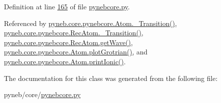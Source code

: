 Definition at line \hyperlink{pynebcore_8py_source_l00165}{165} of file \hyperlink{pynebcore_8py_source}{pynebcore.\+py}.



Referenced by \hyperlink{pynebcore_8py_source_l01367}{pyneb.\+core.\+pynebcore.\+Atom.\+\_\+\+Transition()}, \hyperlink{pynebcore_8py_source_l02696}{pyneb.\+core.\+pynebcore.\+Rec\+Atom.\+\_\+\+Transition()}, \hyperlink{pynebcore_8py_source_l02623}{pyneb.\+core.\+pynebcore.\+Rec\+Atom.\+get\+Wave()}, \hyperlink{pynebcore_8py_source_l02372}{pyneb.\+core.\+pynebcore.\+Atom.\+plot\+Grotrian()}, and \hyperlink{pynebcore_8py_source_l02167}{pyneb.\+core.\+pynebcore.\+Atom.\+print\+Ionic()}.



The documentation for this class was generated from the following file\+:\begin{DoxyCompactItemize}
\item 
pyneb/core/\hyperlink{pynebcore_8py}{pynebcore.\+py}\end{DoxyCompactItemize}
